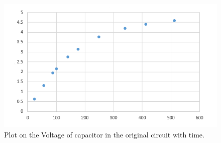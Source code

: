 \begin{figure}[!htbp]
	\centering %
	\begin{framed}
	\includegraphics[width=\linewidth]{images/2_1.PNG} %
	\caption{Plot on the Voltage of capacitor in the original circuit with time.} %
	\end{framed}
	\label{fig:2.1} %
\end{figure}


